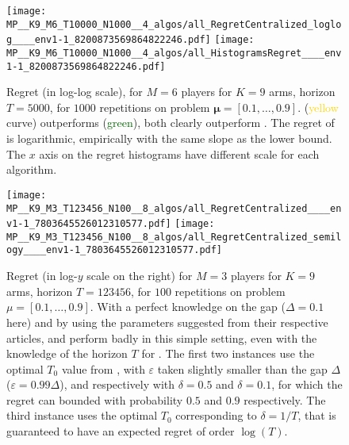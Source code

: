 \begin{figure}[!h]
  \centering
    \texttt{[image: MP\_\_K9\_M6\_T10000\_N1000\_\_4\_algos/all\_RegretCentralized\_loglog\_\_\_\_env1-1\_8200873569864822246.pdf]}
    \texttt{[image: MP\_\_K9\_M6\_T10000\_N1000\_\_4\_algos/all\_HistogramsRegret\_\_\_\_env1-1\_8200873569864822246.pdf]}
  \caption[Regret for $M=6$ players for $K=9$ arms, horizon $T=5000$, for $1000$ repetitions on a fixed problem]{Regret (in log-log scale), for $M=6$ players for $K=9$ arms, horizon $T=5000$, for $1000$ repetitions on problem $\boldsymbol{\mu}=[0.1,\dots,0.9]$. \RandTopM{} (\textcolor{gold}{yellow} curve) outperforms \Selfish{} (\textcolor{darkgreen}{green}), both clearly outperform \rhoRand. The regret of \MCTopM{} is logarithmic, empirically with the same slope as the lower bound. The $x$ axis on the regret histograms have different scale for each algorithm.}
  \label{fig:5:MP__K9_M6_T10000_N1000__4_algos}
\end{figure}




\begin{figure}[!h]
  \centering
      \texttt{[image: MP\_\_K9\_M3\_T123456\_N100\_\_8\_algos/all\_RegretCentralized\_\_\_\_env1-1\_7803645526012310577.pdf]}
      \texttt{[image: MP\_\_K9\_M3\_T123456\_N100\_\_8\_algos/all\_RegretCentralized\_semilogy\_\_\_\_env1-1\_7803645526012310577.pdf]}
  \caption[Regret for $M=3$ players for $K=9$ arms, horizon $T=123456$, for $100$ repetitions on a fixed problem]{Regret (in log-$y$ scale on the right) for $M=3$ players for $K=9$ arms, horizon $T=123456$, for $100$ repetitions on problem $\mu=[0.1,\dots,0.9]$. With a perfect knowledge on the gap ($\Delta=0.1$ here) and by using the parameters suggested from their respective articles, \MEGA{} and \MusicalChair{} perform badly in this simple setting, even with the knowledge of the horizon $T$ for \MusicalChair{}. The first two \MusicalChair{} instances use the optimal $T_0$ value from \cite{Rosenski16}, with $\varepsilon$ taken slightly smaller than the gap $\Delta$ ($\varepsilon=0.99 \Delta$), and respectively with $\delta=0.5$ and $\delta=0.1$, for which the regret can bounded with probability $0.5$ and $0.9$ respectively. The third instance uses the optimal $T_0$ corresponding to $\delta=1/T$, that is guaranteed to have an expected regret of order $\log(T)$.}
  \label{fig:5:MP__K9_M3_T123456_N100__8_algos}
\end{figure}

